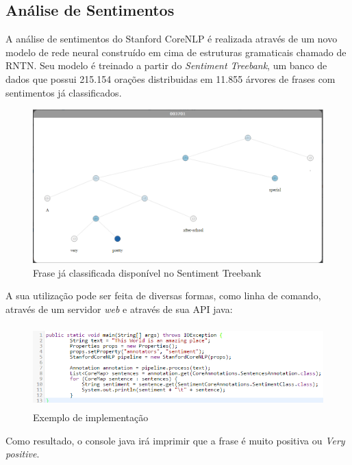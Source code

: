 \subsection{Análise de Sentimentos}

A análise de sentimentos do Stanford CoreNLP é realizada através de um novo
modelo de rede neural construído em cima de estruturas gramaticais chamado de
\ac{RNTN}. Seu modelo é treinado a partir do \textit{Sentiment Treebank}, um
banco de dados que possui 215.154 orações distribuidas em 11.855 árvores de
frases com sentimentos já classificados.

\begin{figure}[!htbp]
 \centering
 \includegraphics[height=225px]{imagens/corenlp.png}
 \caption{Frase já classificada disponível no Sentiment Treebank}
 \label{fig:corenlp}
\end{figure}

A sua utilização pode ser feita de diversas formas, como linha de comando,
através de um servidor \textit{web} e através de sua API java:
\newpage

\begin{figure}[!htbp]
 \centering
 \includegraphics[height=120px]{imagens/corenlp1.png}
 \caption{Exemplo de implementação}
 \label{fig:corenlp}
\end{figure}

Como resultado, o console java irá imprimir que a frase é muito positiva ou
\textit{Very positive}.

